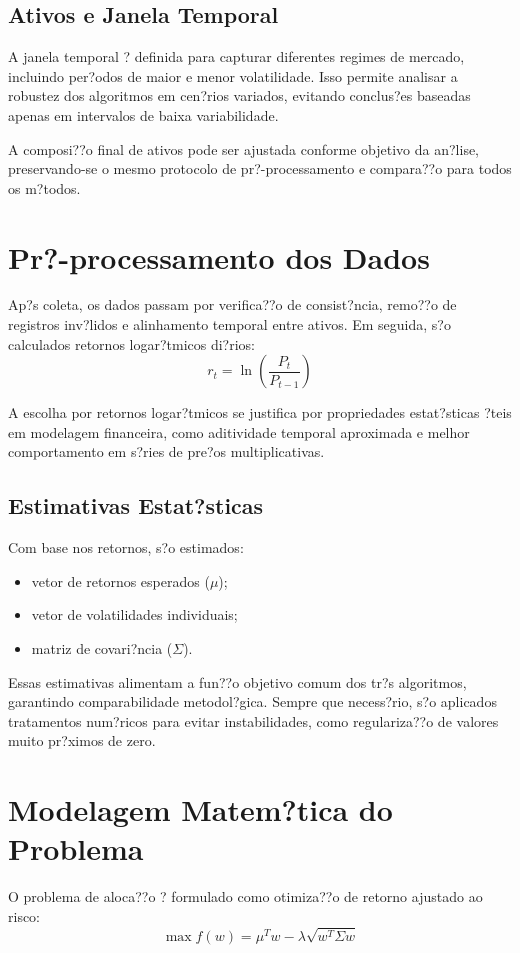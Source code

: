 ﻿\documentclass[
  12pt,
  oneside,
  a4paper,
  brazil
]{abntex2}
\begin{document}
\subsection{Ativos e Janela Temporal}
A janela temporal ? definida para capturar diferentes regimes de mercado, incluindo per?odos de maior e menor volatilidade. Isso permite analisar a robustez dos algoritmos em cen?rios variados, evitando conclus?es baseadas apenas em intervalos de baixa variabilidade.

A composi??o final de ativos pode ser ajustada conforme objetivo da an?lise, preservando-se o mesmo protocolo de pr?-processamento e compara??o para todos os m?todos.

\section{Pr?-processamento dos Dados}
Ap?s coleta, os dados passam por verifica??o de consist?ncia, remo??o de registros inv?lidos e alinhamento temporal entre ativos. Em seguida, s?o calculados retornos logar?tmicos di?rios:
\[
r_t = \ln\left(\frac{P_t}{P_{t-1}}\right)
\]

A escolha por retornos logar?tmicos se justifica por propriedades estat?sticas ?teis em modelagem financeira, como aditividade temporal aproximada e melhor comportamento em s?ries de pre?os multiplicativas.

\subsection{Estimativas Estat?sticas}
Com base nos retornos, s?o estimados:
\begin{itemize}
  \item vetor de retornos esperados ($\mu$);
  \item vetor de volatilidades individuais;
  \item matriz de covari?ncia ($\Sigma$).
\end{itemize}

Essas estimativas alimentam a fun??o objetivo comum dos tr?s algoritmos, garantindo comparabilidade metodol?gica. Sempre que necess?rio, s?o aplicados tratamentos num?ricos para evitar instabilidades, como regulariza??o de valores muito pr?ximos de zero.

\section{Modelagem Matem?tica do Problema}
O problema de aloca??o ? formulado como otimiza??o de retorno ajustado ao risco:
\[
\max f(w)=\mu^T w-\lambda\sqrt{w^T\Sigma w}
\]
\end{document}

